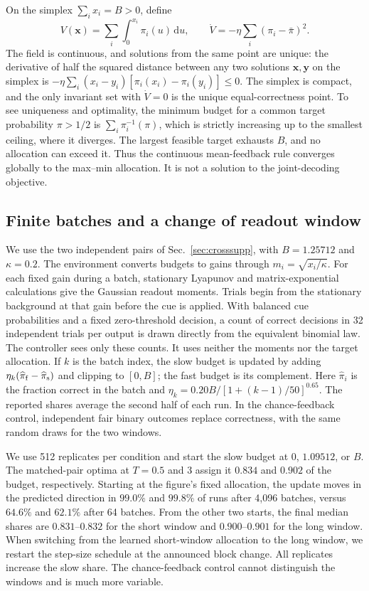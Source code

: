 \documentclass[aps,10pt,onecolumn,superscriptaddress,nofootinbib,
  longbibliography,amsmath,amssymb,floatfix]{revtex4-2}
\newcommand{\dd}{\mathrm{d}}
\begin{document}
On the simplex \(\sum_i x_i=B>0\), define
\begin{equation}
 V(\boldsymbol{x})=\sum_i\int_0^{x_i}\pi_i(u)\,\dd u,
 \qquad
 \dot V=-\eta\sum_i(\pi_i-\bar\pi)^2 .
 \label{eq:feedback_lyap}
\end{equation}
The field is continuous, and solutions from the same point are
unique: the derivative of half the squared distance between any
two solutions \(\boldsymbol{x},\boldsymbol{y}\) on the simplex
is \(-\eta\sum_i(x_i-y_i)[\pi_i(x_i)-\pi_i(y_i)]\le0\).
The simplex is compact, and the only invariant set with
\(\dot V=0\) is the unique equal-correctness point. To see uniqueness
and optimality, the minimum budget for a common target probability
\(\pi>1/2\) is \(\sum_i\pi_i^{-1}(\pi)\), which is strictly increasing
up to the smallest ceiling, where it diverges. The largest feasible
target exhausts \(B\), and no allocation can exceed it. Thus
the continuous mean-feedback rule converges globally to the max--min
allocation. It is not a solution to the joint-decoding objective.

\subsection{Finite batches and a change of readout window}

We use the two independent pairs of
Sec.~\ref{sec:crosssupp}, with \(B=1.25712\) and \(\kappa=0.2\).
The environment converts budgets to gains through
\(m_i=\sqrt{x_i/\kappa}\). For each fixed gain during a batch,
stationary Lyapunov and matrix-exponential calculations give the
Gaussian readout moments. Trials begin from the stationary
background at that gain before the cue is applied. With balanced
cue probabilities and a fixed zero-threshold decision, a count
of correct decisions in 32 independent trials per output is drawn
directly from the equivalent binomial law. The controller sees
only these counts. It uses neither the moments nor the target
allocation. If \(k\) is the batch index, the slow budget is updated
by adding \(\eta_k(\widehat\pi_{\rm f}-\widehat\pi_{\rm s})\)
and clipping to \([0,B]\); the fast budget is its complement.
Here \(\widehat\pi_i\) is the fraction correct in the batch and
\(\eta_k=0.20B/[1+(k-1)/50]^{0.65}\). The reported shares average
the second half of each run. In the chance-feedback control,
independent fair binary outcomes replace correctness, with the
same random draws for the two windows.

We use 512 replicates per condition and start the slow budget
at \(0\), \(1.09512\), or \(B\). The matched-pair optima at
\(T=0.5\) and \(3\) assign it \(0.834\) and \(0.902\) of the
budget, respectively. Starting at the figure's fixed allocation,
the update moves in the predicted direction in \(99.0\%\) and
\(99.8\%\) of runs after 4,096 batches, versus \(64.6\%\) and
\(62.1\%\) after 64 batches. From the other two starts, the final
median shares are \(0.831\)--\(0.832\) for the short window and
\(0.900\)--\(0.901\) for the long window. When switching from
the learned short-window allocation to the long window, we
restart the step-size schedule at the announced block change.
All replicates increase the slow share. The chance-feedback
control cannot distinguish the windows and is much more variable.
\end{document}
